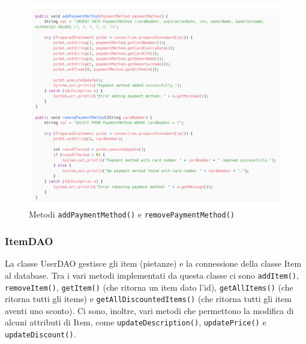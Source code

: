\documentclass{article}
\begin{document}
\begin{figure}[!h]
    \includegraphics[width=1.0\linewidth]{imgs/snippets/Code_ClassPaymentMethod.png}
    \caption{Metodi \texttt{addPaymentMethod()} e \texttt{removePaymentMethod()}}
    \label{code_classPaymentMethodDAO}
\end{figure}

\clearpage

\subsubsection{ItemDAO}
La classe UserDAO gestisce gli item (pietanze) e la connessione della classe Item al database. Tra i vari metodi implementati da questa classe ci sono \texttt{addItem()}, \texttt{removeItem()}, \texttt{getItem()} (che ritorna un item dato l'id), \texttt{getAllItems()} (che ritorna tutti gli items) e \texttt{getAllDiscountedItems()} (che ritorna tutti gli item aventi uno sconto). Ci sono, inoltre, vari metodi che permettono la modifica di alcuni attributi di Item, come \texttt{updateDescription()}, \texttt{updatePrice()} e \texttt{updateDiscount()}.
\end{document}
